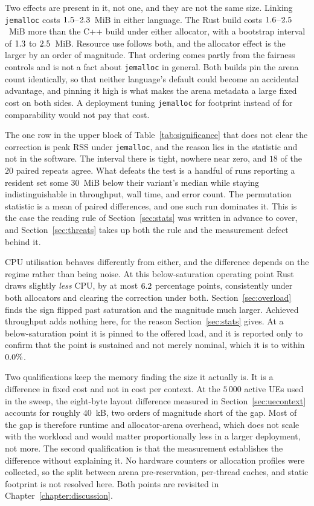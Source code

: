 \documentclass[english,oneside,a4paper,censored,csm,software-track-2020]{HYthesisML}
\begin{document}
Two effects are present in it, not one, and they are not the same size. Linking
\texttt{jemalloc} costs $1.5$--$2.3$~MiB in either language. The Rust
build costs $1.6$--$2.5$~MiB more than the C++ build under either allocator,
with a bootstrap interval of $1.3$ to $2.5$~MiB. Resource use follows both, and
the allocator effect is the larger by an order of magnitude. That ordering comes partly from the
fairness controls and is not a fact about \texttt{jemalloc} in general. Both builds pin the arena
count identically, so that neither language's default could become an accidental advantage, and
pinning it high is what makes the arena metadata a large fixed cost on both sides. A deployment
tuning \texttt{jemalloc} for footprint instead of for comparability would not pay that cost.

The one row in the upper block of Table~\ref{tab:significance} that does not clear the
correction is peak RSS under
\texttt{jemalloc}, and the reason lies in the statistic and not in the software. The
interval there is tight, nowhere near zero, and $18$ of the $20$ paired repeats agree. What
defeats the test is a handful of runs reporting a resident set some $30$~MiB below their variant's
median while staying indistinguishable in throughput, wall time, and error count. The
permutation statistic is a mean of paired differences, and one such run dominates it. This is the case the
reading rule of Section~\ref{sec:stats} was written in advance to cover, and
Section~\ref{sec:threats} takes up both the rule and the measurement defect behind it.

CPU utilisation behaves differently from either, and the difference depends on the regime rather
than being noise. At this below-saturation operating point Rust draws slightly \emph{less} CPU, by
at most $6.2$ percentage points, consistently under both allocators and clearing the
correction under both. Section~\ref{sec:overload} finds the sign flipped past saturation and the
magnitude much larger. Achieved throughput adds nothing here, for the reason
Section~\ref{sec:stats} gives. At a below-saturation point it is pinned to the offered load, and
it is reported only to confirm that the point is sustained and not merely nominal, which it is to
within $0.0\%$.

Two qualifications keep the memory finding the size it actually is. It is a difference in fixed
cost and not in cost per context. At the $5\,000$ active UEs used in the sweep, the
eight-byte layout difference measured in Section~\ref{sec:uecontext} accounts for roughly
$40$~kB, two orders of magnitude short of the gap. Most of the gap is therefore runtime and
allocator-arena overhead, which does not scale with the workload and would matter proportionally
less in a larger deployment, not more. The second qualification is that the measurement
establishes the difference without explaining it. No hardware counters or allocation profiles were
collected, so the split between arena pre-reservation, per-thread caches, and static footprint is
not resolved here. Both points are revisited in Chapter~\ref{chapter:discussion}.
\end{document}
